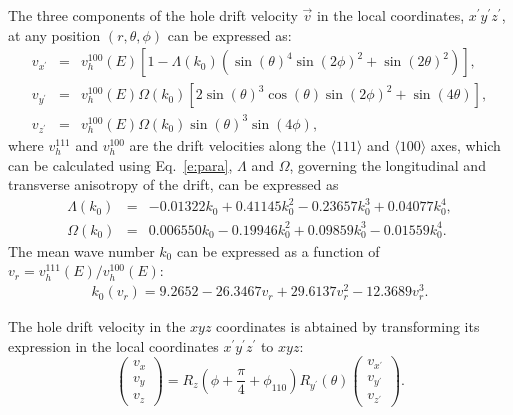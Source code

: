 \documentclass[epj]{svjour}
\begin{document}
\begin{appendices}
The three components of the hole drift velocity $\vec{v}$ in the local
coordinates, $x^{\prime} y^{\prime} z^{\prime}$, at any position $(r,
\theta, \phi)$ can be expressed as:
\begin{eqnarray*} 
\label{e:vsphere} 
v_{x^{\prime}} &=& v^{100}_{h}(E)
[1-\Lambda(k_{0})(\sin(\theta)^{4}\sin(2\phi)^{2} + \sin(2\theta)^{2})],\\ 
v_{y^{\prime}} &=& v^{100}_{h}(E)\Omega(k_{0})
[2\sin(\theta)^{3}\cos(\theta)\sin(2\phi)^{2} + \sin(4\theta)],\\ 
v_{z^{\prime}} &=& v^{100}_{h}(E)\Omega(k_{0})\sin(\theta)^{3}\sin(4\phi), 
\end{eqnarray*} 
where $v^{111}_{h}$ and $v^{100}_{h}$ are the drift velocities along
the $\langle 111 \rangle$ and $\langle 100 \rangle$ axes, which can be
calculated using Eq.~\ref{e:para}, $\Lambda$ and $\Omega$, governing
the longitudinal and transverse anisotropy of the drift, can be
expressed as
\begin{eqnarray*} 
\label{e:lamb} 
\Lambda(k_{0}) &=& -0.01322k_{0} + 0.41145k_{0}^{2} - 0.23657k_{0}^{3} + 0.04077k_{0}^{4},\\
\Omega(k_{0}) &=& 0.006550k_{0} - 0.19946k_{0}^{2} + 0.09859k_{0}^{3} - 0.01559k_{0}^{4}. 
\end{eqnarray*} 
The mean wave number $k_{0}$ can be expressed as a function of
$v_{r} = v^{111}_{h}(E)/v^{100}_{h}(E)$:
\begin{eqnarray*} 
\label{e:k0} 
k_{0}(v_{r}) = 9.2652 - 26.3467v_{r} + 29.6137v_{r}^{2} - 12.3689v_{r}^{3}. 
\end{eqnarray*} 
 
The hole drift velocity in the $xyz$ coordinates is abtained by
transforming its expression in the local coordinates $x^{\prime}
y^{\prime} z^{\prime}$ to $xyz$:
\begin{equation*} 
\label{e:v2v}   
\left( 
\begin{array}{c} 
v_{x} \\ v_{y} \\ v_{z} 
\end{array} 
\right) = R_{z}(\phi + \frac{\pi}{4} + \phi_{110}) R_{y^{\prime}}(\theta) \left(  
\begin{array}{c} 
v_{x^{\prime}} \\ v_{y^{\prime}} \\ v_{z^{\prime}} 
\end{array} \right).
\end{equation*}

\end{appendices}
\end{document}
